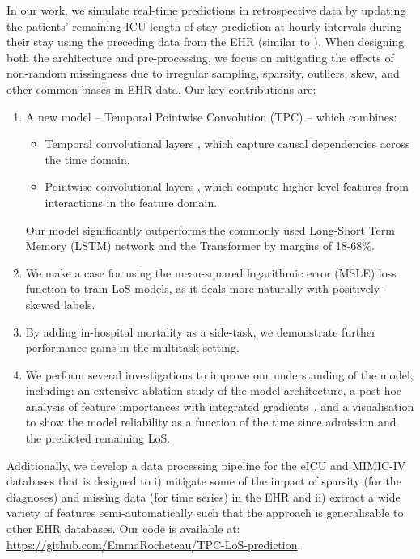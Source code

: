 \documentclass[sigconf]{acmart}
\begin{document}
In our work, we simulate real-time predictions in retrospective data by updating the patients' remaining ICU length of stay prediction at hourly intervals during their stay using the preceding data from the EHR (similar to \citet{harutyunyan}). When designing both the architecture and pre-processing, we focus on mitigating the effects of non-random missingness due to irregular sampling, sparsity, outliers, skew, and other common biases in EHR data. Our key contributions are:
\begin{enumerate}
    \item A new model -- Temporal Pointwise Convolution (TPC) -- which combines:
    \begin{itemize}
        \item Temporal convolutional layers \citep{Simonyan2016, DBLP:journals/corr/KalchbrennerESO16}, which capture causal dependencies across the time domain.
        \item Pointwise convolutional layers \citep{lin2013network}, which compute higher level features from interactions in the feature domain.
    \end{itemize}
    Our model significantly outperforms the commonly used Long-Short Term Memory (LSTM) network \citep{10.1162/neco.1997.9.8.1735} and the Transformer \citep{46201} by margins of 18-68\%.
    \item We make a case for using the mean-squared logarithmic error (MSLE) loss function to train LoS models, as it deals more naturally with positively-skewed labels.
    \item By adding in-hospital mortality as a side-task, we demonstrate further performance gains in the multitask setting.
    \item We perform several investigations to improve our understanding of the model, including: an extensive ablation study of the model architecture, a post-hoc analysis of feature importances with integrated gradients~\citep{integratedgradients}, and a visualisation to show the model reliability as a function of the time since admission and the predicted remaining LoS.
\end{enumerate}

Additionally, we develop a data processing pipeline for the eICU \citep{Pollard2018} and MIMIC-IV \cite{johnson} databases that is designed to i) mitigate some of the impact of sparsity (for the diagnoses) and missing data (for time series) in the EHR and ii) extract a wide variety of features semi-automatically such that the approach is generalisable to other EHR databases. Our code is available at: \url{https://github.com/EmmaRocheteau/TPC-LoS-prediction}.
\end{document}
